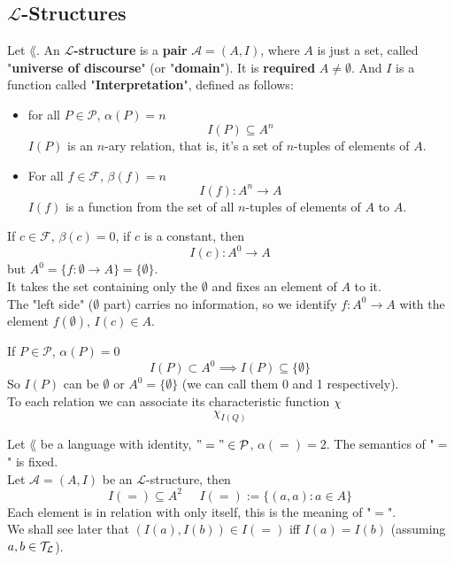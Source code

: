 \subsection{$\mathcal{L}$-Structures}
Let $\lang$. An \textbf{$\mathcal{L}$-structure} is a \textbf{pair} $\mathcal{A} = (A, I)$, where $A$ is just a set, called "\textbf{universe of discourse}" (or "\textbf{domain}"). It is \textbf{required} $A \neq \emptyset$. And $I$ is a function called "\textbf{Interpretation}", defined as follows: 
\begin{itemize}
	\item for all $P \in \mathcal{P}$, $\alpha (P) = n$
	$$ I(P) \subseteq A^n $$
	$I(P)$ is an $n$-ary relation, that is, it's a set of $n$-tuples of elements of $A$.\\
	
	\item For all $f \in \mathcal{F}$, $\beta(f) = n$
	$$ I(f):  A^n \rightarrow A $$
	$I(f)$ is a function from the set of all $n$-tuples of elements of $A$ to $A$.\\
\end{itemize}

\begin{remark}
	If $c \in \mathcal{F}$, $\beta (c) = 0$, if $c$ is a constant, then 
	$$ I(c) : A^0 \rightarrow A$$
	but $A^0 = \{f: \emptyset \rightarrow A \} = \{\emptyset\}$.\\
	It takes the set containing only the $\emptyset$ and fixes an element of $A$ to it. \\
	
	The "left side" ($\emptyset$ part) carries no information, so we identify $f:A^0 \rightarrow A$ with the element $f(\emptyset)$, $I(c) \in A$.\\
\end{remark}

\begin{remark}
	If $P \in \mathcal{P}$, $\alpha (P) = 0$
	$$ I(P) \subset A^0 \implies I(P) \subseteq \{\emptyset\}$$
	So $I(P)$ can be $\emptyset$ or $A^0 = \{\emptyset\}$ (we can call them 0 and 1 respectively).\\
	
	To each relation we can associate its characteristic function $\chi$
	$$ \chi_{I(Q)}$$
\end{remark}

\begin{remark}
	Let $\lang$ be a language with identity, $"=" \in \mathcal{P}$, $\alpha(=) = 2$. The semantics of "$=$" is fixed. \\
	Let $\mathcal{A} = (A,I)$ be an $\mathcal{L}$-structure, then 
	$$ I (=) \subseteq A^2 \;\;\;\;\; I (=) := \{ (a,a): a \in A\} $$
	Each element is in relation with only itself, this is the meaning of "$=$".\\
	We shall see later that $(I(a), I(b)) \in I(=)$ iff $I(a) = I(b)$ (assuming $a,b \in \mathcal{T}_\mathcal{L}$).\\
\end{remark}


